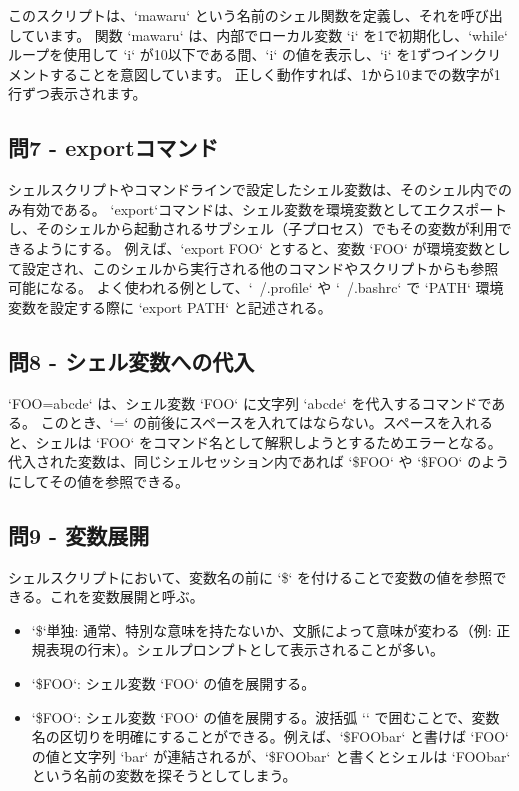 \documentclass[a4paper,11pt]{jsarticle}
\begin{document}
このスクリプトは、`mawaru` という名前のシェル関数を定義し、それを呼び出しています。
関数 `mawaru` は、内部でローカル変数 `i` を1で初期化し、`while` ループを使用して `i` が10以下である間、`i` の値を表示し、`i` を1ずつインクリメントすることを意図しています。
正しく動作すれば、1から10までの数字が1行ずつ表示されます。

\subsection*{問7 - exportコマンド}
シェルスクリプトやコマンドラインで設定したシェル変数は、そのシェル内でのみ有効である。
`export`コマンドは、シェル変数を環境変数としてエクスポートし、そのシェルから起動されるサブシェル（子プロセス）でもその変数が利用できるようにする。
例えば、`export FOO` とすると、変数 `FOO` が環境変数として設定され、このシェルから実行される他のコマンドやスクリプトからも参照可能になる。
よく使われる例として、`~/.profile` や `~/.bashrc` で `PATH` 環境変数を設定する際に `export PATH` と記述される。

\subsection*{問8 - シェル変数への代入}
`FOO=abcde` は、シェル変数 `FOO` に文字列 `abcde` を代入するコマンドである。
このとき、`=` の前後にスペースを入れてはならない。スペースを入れると、シェルは `FOO` をコマンド名として解釈しようとするためエラーとなる。
代入された変数は、同じシェルセッション内であれば `\${FOO}` や `\$FOO` のようにしてその値を参照できる。

\subsection*{問9 - 変数展開}
シェルスクリプトにおいて、変数名の前に `\$` を付けることで変数の値を参照できる。これを変数展開と呼ぶ。
\begin{itemize}
    \item `\$`単独: 通常、特別な意味を持たないか、文脈によって意味が変わる（例: 正規表現の行末）。シェルプロンプトとして表示されることが多い。
    \item `\$FOO`: シェル変数 `FOO` の値を展開する。
    \item `\${FOO}`: シェル変数 `FOO` の値を展開する。波括弧 `{}` で囲むことで、変数名の区切りを明確にすることができる。例えば、`\${FOO}bar` と書けば `FOO` の値と文字列 `bar` が連結されるが、`\$FOObar` と書くとシェルは `FOObar` という名前の変数を探そうとしてしまう。
\end{itemize}
\end{document}
